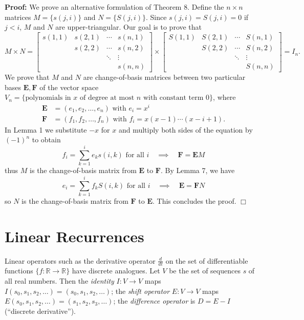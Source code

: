 \documentclass[11pt]{article}
\newenvironment{proof}{\noindent \textbf{Proof:}}{$\Box$}
\newcommand{\R}{\mathbb R} %
\begin{document}
\begin{proof} 
    We prove an alternative formulation of Theorem 8.
    Define the $n \times n$ matrices $M=\{s(j,i)\}$ and $N=\{S(j,i)\}$. 
    Since $s(j,i)=S(j,i)=0$ if $j<i$, $M$ and $N$ are upper-triangular.
    Our goal is to prove that 
    \[
    M\times N = 
    \begin{bmatrix}
        s(1,1)&s(2,1)&\cdots&s(n,1)\\
        &s(2,2)&\cdots&s(n,2)\\
        &&\ddots&\vdots\\
        &&&s(n,n)
    \end{bmatrix}\times
    \begin{bmatrix}
        S(1,1)&S(2,1)&\cdots&S(n,1)\\
        &S(2,2)&\cdots&S(n,2)\\
        &&\ddots&\vdots\\
        &&&S(n,n)
    \end{bmatrix}
    =I_n.
    \]
    We prove that $M$ and $N$ are change-of-basis matrices between two particular bases $\boldsymbol{E},\boldsymbol{F}$
    of the vector space $V_n=\{\text{polynomials in }x\text{ of degree at most }n\text{ with constant term }0\}$, where
    \begin{align*}
        \boldsymbol{E} &= (e_1, e_2, \ldots, e_n)\text{ with } e_i = x^i\\
        \boldsymbol{F} &= (f_1, f_2, \ldots, f_n)\text{ with } f_i = x(x-1)\cdots(x-i+1).
    \end{align*}
    In Lemma 1 we substitute $-x$ for $x$ and multiply both sides 
    of the equation by $(-1)^n$ to obtain
    \[f_i = \sum_{k=1}^ie_ks(i,k)\text{ for all }i\quad\implies\quad\boldsymbol{F} = \boldsymbol{E}M\]
    thus $M$ is the change-of-basis matrix from $\boldsymbol{E}$ to $\boldsymbol{F}$.
    By Lemma 7, we have
    \[e_i = \sum_{k=1}^if_kS(i,k)\text{ for all }i\quad\implies\quad\boldsymbol{E} = \boldsymbol{F}N\]
    so $N$ is the change-of-basis matrix from $\boldsymbol{F}$ to $\boldsymbol{E}$. This concludes the proof.
\end{proof}

\section{Linear Recurrences}
Linear operators such as the derivative operator $\frac{d}{dt}$ on the set of differentiable functions $\{f:\R\to\R\}$
have discrete analogues. Let $V$ be the set of sequences $s$ of all real numbers. Then 
the \textit{identity} $I:V\to V$ maps $I(s_0,s_1,s_2,\ldots) = (s_0,s_1,s_2,\ldots)$; 
the \textit{shift operator} $E:V\to V$ maps $E(s_0,s_1,s_2,\ldots) = (s_1,s_2,s_3,\ldots)$; 
the \textit{difference operator} is $D=E-I$ (``discrete derivative'').
\end{document}
